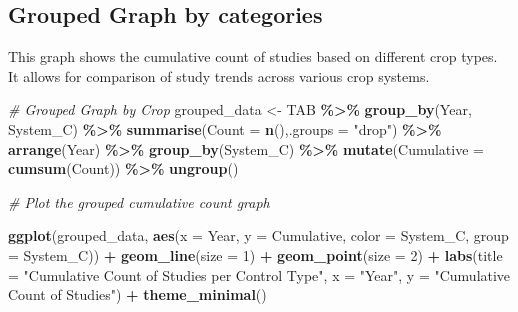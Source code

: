 \documentclass[
]{book}
\newenvironment{Shaded}{\begin{snugshade}}{\end{snugshade}}
\newcommand{\AttributeTok}[1]{\textcolor[rgb]{0.13,0.29,0.53}{#1}}
\newcommand{\CommentTok}[1]{\textcolor[rgb]{0.56,0.35,0.01}{\textit{#1}}}
\newcommand{\DecValTok}[1]{\textcolor[rgb]{0.00,0.00,0.81}{#1}}
\newcommand{\FunctionTok}[1]{\textcolor[rgb]{0.13,0.29,0.53}{\textbf{#1}}}
\newcommand{\NormalTok}[1]{#1}
\newcommand{\OtherTok}[1]{\textcolor[rgb]{0.56,0.35,0.01}{#1}}
\newcommand{\SpecialCharTok}[1]{\textcolor[rgb]{0.81,0.36,0.00}{\textbf{#1}}}
\newcommand{\StringTok}[1]{\textcolor[rgb]{0.31,0.60,0.02}{#1}}
\begin{document}
\subsection{Grouped Graph by categories}\label{grouped-graph-by-categories}

This graph shows the cumulative count of studies based on different crop types.
It allows for comparison of study trends across various crop systems.

\begin{Shaded}
\begin{Highlighting}[]
\CommentTok{\# Grouped Graph by Crop}
\NormalTok{grouped\_data }\OtherTok{\textless{}{-}}\NormalTok{ TAB }\SpecialCharTok{\%\textgreater{}\%}
 \FunctionTok{group\_by}\NormalTok{(Year, System\_C) }\SpecialCharTok{\%\textgreater{}\%} \FunctionTok{summarise}\NormalTok{(}\AttributeTok{Count =} \FunctionTok{n}\NormalTok{(),}\AttributeTok{.groups =} \StringTok{"drop"}\NormalTok{) }\SpecialCharTok{\%\textgreater{}\%}
  \FunctionTok{arrange}\NormalTok{(Year) }\SpecialCharTok{\%\textgreater{}\%}
  \FunctionTok{group\_by}\NormalTok{(System\_C) }\SpecialCharTok{\%\textgreater{}\%}
\FunctionTok{mutate}\NormalTok{(}\AttributeTok{Cumulative =} \FunctionTok{cumsum}\NormalTok{(Count)) }\SpecialCharTok{\%\textgreater{}\%} 
  \FunctionTok{ungroup}\NormalTok{()}

\CommentTok{\# Plot the grouped cumulative count graph}

\FunctionTok{ggplot}\NormalTok{(grouped\_data, }\FunctionTok{aes}\NormalTok{(}\AttributeTok{x =}\NormalTok{ Year, }\AttributeTok{y =}\NormalTok{ Cumulative, }\AttributeTok{color =}\NormalTok{ System\_C, }\AttributeTok{group =}\NormalTok{ System\_C)) }\SpecialCharTok{+}
  \FunctionTok{geom\_line}\NormalTok{(}\AttributeTok{size =} \DecValTok{1}\NormalTok{) }\SpecialCharTok{+} 
  \FunctionTok{geom\_point}\NormalTok{(}\AttributeTok{size =} \DecValTok{2}\NormalTok{) }\SpecialCharTok{+} 
  \FunctionTok{labs}\NormalTok{(}\AttributeTok{title =} \StringTok{"Cumulative Count of Studies per Control Type"}\NormalTok{, }
       \AttributeTok{x =} \StringTok{"Year"}\NormalTok{, }
       \AttributeTok{y =} \StringTok{"Cumulative Count of Studies"}\NormalTok{) }\SpecialCharTok{+}
  \FunctionTok{theme\_minimal}\NormalTok{()}
\end{Highlighting}
\end{Shaded}
\end{document}
